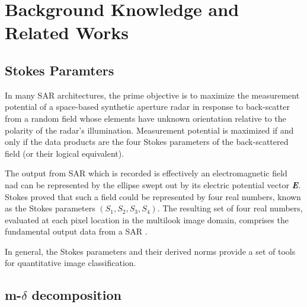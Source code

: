 
\chapter{Background Knowledge and Related Works} %

\label{Chapter2} %


\section{Stokes Paramters}

In many SAR architectures, the prime objective is to maximize
the measurement potential of a space-based synthetic aperture radar in response to back-scatter from a random field whose elements have unknown orientation relative to the polarity of the radar’s illumination. Measurement potential is maximized if and only if the  data products are the four Stokes parameters of the back-scattered field (or their logical equivalent)\cite{raney2006dual}.

The output from SAR which is recorded is effectively an electromagnetic field nad can be represented  by  the ellipse swept out by its electric potential vector \textit{\textbf{E}}. Stokes proved  that  such  a  field  could  be  represented  by  four real numbers, known as the Stokes parameters $(S_1,S_2,S_3,S_4)$. The  resulting  set  of four  real  numbers,  evaluated  at  each  pixel  location  in  the multilook  image  domain,  comprises  the  fundamental  output data from a SAR \cite{raney2007hybrid}.

In  general,  the  Stokes  parameters and their derived norms provide a set of tools for quantitative image classification.

\section{m-$\delta$ decomposition}

